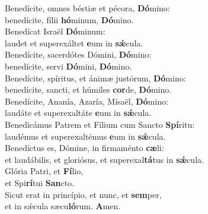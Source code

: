 \evenverse Benedícite, omnes béstiæ et pécora, \textbf{Dó}mino:~\*\\
\evenverse benedícite, fílii \textbf{hó}minum, \textbf{Dó}mino.\\
\oddverse Benedícat Israël \textbf{Dó}minum:~\*\\
\oddverse laudet et superexáltet \textbf{e}um in \textbf{sǽ}cula.\\
\evenverse Benedícite, sacerdótes Dómini, \textbf{Dó}mino:~\*\\
\evenverse benedícite, servi \textbf{Dó}mini, \textbf{Dó}mino.\\
\oddverse Benedícite, spíritus, et ánimæ justórum, \textbf{Dó}mino:~\*\\
\oddverse benedícite, sancti, et húmiles \textbf{cor}de, \textbf{Dó}mino.\\
\evenverse Benedícite, Ananía, Azaría, Mísaël, \textbf{Dó}mino:~\*\\
\evenverse laudáte et superexaltáte \textbf{e}um in \textbf{sǽ}cula.\\
\oddverse Benedicámus Patrem et Fílium cum Sancto \textbf{Spí}ritu:~\*\\
\oddverse laudémus et superexaltémus \textbf{e}um in \textbf{sǽ}cula.\\
\evenverse Benedíctus es, Dómine, in firmaménto \textbf{cæ}li:~\*\\
\evenverse et laudábilis, et gloriósus, et superexal\textbf{tá}tus in \textbf{sǽ}cula.\\
\oddverse Glória Patri, et \textbf{Fí}lio,~\*\\
\oddverse et Spi\textbf{rí}tui \textbf{San}cto.\\
\evenverse Sicut erat in princípio, et nunc, et \textbf{sem}per,~\*\\
\evenverse et in sǽcula sæcu\textbf{ló}rum. \textbf{A}men.\\
